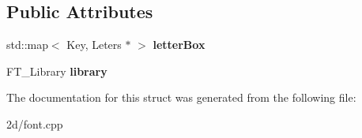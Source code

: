 \subsection*{Public Attributes}
\begin{DoxyCompactItemize}
\item 
\hypertarget{struct_tempest_1_1_font_element_1_1_free_type_lib_a3ce44dd439db0a579f24a4d29d45b5de}{std\+::map$<$ Key, Leters $\ast$ $>$ {\bfseries letter\+Box}}\label{struct_tempest_1_1_font_element_1_1_free_type_lib_a3ce44dd439db0a579f24a4d29d45b5de}

\item 
\hypertarget{struct_tempest_1_1_font_element_1_1_free_type_lib_a58d3ddc5dc093eafa5a98d8be01bd8d7}{F\+T\+\_\+\+Library {\bfseries library}}\label{struct_tempest_1_1_font_element_1_1_free_type_lib_a58d3ddc5dc093eafa5a98d8be01bd8d7}

\end{DoxyCompactItemize}


The documentation for this struct was generated from the following file\+:\begin{DoxyCompactItemize}
\item 
2d/font.\+cpp\end{DoxyCompactItemize}
